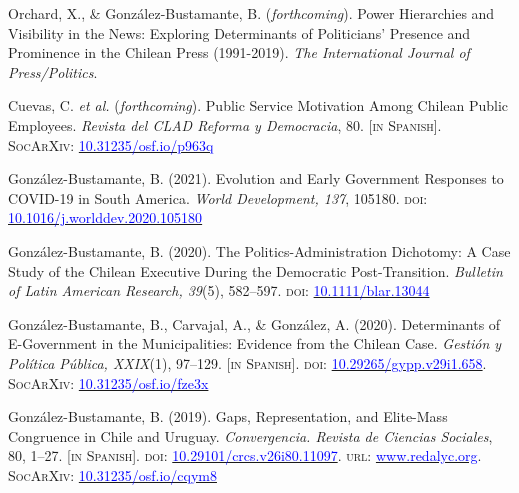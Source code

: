 \begin{publications}

\begin{benumerate}{7}

\item{Orchard, X., \& González-Bustamante, B. ({\itshape forthcoming}). Power Hierarchies and Visibility in the News: Exploring Determinants of Politicians’ Presence and Prominence in the Chilean Press (1991-2019). {\itshape The International Journal of Press/Politics}.}

\item{\small Cuevas, C. {\itshape et al.} ({\itshape forthcoming}). Public Service Motivation Among Chilean Public Employees. {\itshape Revista del CLAD Reforma y Democracia}, 80. {\footnotesize \scshape [in Spanish]}. {\scshape \footnotesize SocArXiv}: \href{https://doi.org/10.31235/osf.io/p963q}{\textcolor{blue}{10.31235/osf.io/p963q}}}\vspace{1mm}

\item{\small Gonz\'alez-Bustamante, B. (2021). Evolution and Early Government Responses to COVID-19 in South America. {\itshape World Development, 137}, 105180. {\scshape doi:} \href{https://doi.org/10.1016/j.worlddev.2020.105180}{\textcolor{blue}{10.1016/j.worlddev.2020.105180}}}\vspace{1mm}

\item{\small Gonz\'alez-Bustamante, B. (2020). The Politics-Administration Dichotomy: A Case Study of the Chilean Executive During the Democratic Post-Transition. {\itshape Bulletin of Latin American Research, 39}(5), 582--597. {\scshape doi}: \href{https://doi.org/10.1111/blar.13044}{\textcolor{blue}{10.1111/blar.13044}}}\vspace{1mm}

\item{\small Gonz\'alez-Bustamante, B., Carvajal, A., \& Gonz\'alez, A. (2020). Determinants of E-Government in the Municipalities: Evidence from the Chilean Case. {\itshape Gesti\'on y Pol\'itica P\'ublica, XXIX}(1), 97--129. {\footnotesize \scshape [in Spanish]}. {\scshape doi:} \href{http://dx.doi.org/10.29265/gypp.v29i1.658}{\textcolor{blue}{10.29265/gypp.v29i1.658}}. {\scshape \footnotesize SocArXiv}: \href{https://doi.org/10.31235/osf.io/fze3x}{\textcolor{blue}{10.31235/osf.io/fze3x}}} \vspace{1mm}

\item{\small Gonz\'alez-Bustamante, B. (2019). Gaps, Representation, and Elite-Mass Congruence in Chile and Uruguay. {\itshape Convergencia. Revista de Ciencias Sociales}, 80, 1--27. {\footnotesize \scshape [in Spanish]}. {\scshape doi}: \href{https://doi.org/10.29101/crcs.v26i80.11097}{\textcolor{blue}{10.29101/crcs.v26i80.11097}}. {\scshape url}:  \href{https://www.redalyc.org/jatsRepo/105/10559568002/index.html}{\textcolor{blue}{www.redalyc.org}}. {\scshape \footnotesize SocArXiv}: \href{https://doi.org/10.31235/osf.io/cqym8}{\textcolor{blue}{10.31235/osf.io/cqym8}}}\vspace{1mm}


\end{benumerate}
\end{publications}
